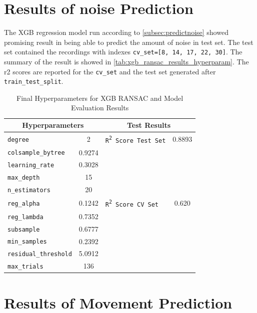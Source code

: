 \documentclass{iutbscthesis}
\begin{document}
\section{Results of noise Prediction}
The XGB regression model run according to \autoref{subsec:predictnoise} showed promising result in being able to predict the amount of noise in test set. The test set contained the recordings with indexes \texttt{cv\_set=[8, 14, 17, 22, 30]}. The summary of the result is showed in \autoref{tab:xgb_ransac_results_hyperparam}. The r2 scores are reported for the \texttt{cv\_set} and the test set generated after \texttt{train\_test\_split}.
\begin{table}[htbp]
\centering
\caption{Final Hyperparameters for XGB RANSAC and Model Evaluation Results}
\label{tab:xgb_ransac_results_hyperparam}
\begin{tabular}{|l|c||l|c|}
    \hline
        \multicolumn{2}{|c||}{\textbf{Hyperparameters}} & \multicolumn{2}{c|}{\textbf{Test Results}} \\
        \hline
        \texttt{degree} & 2 & \texttt{R\textsuperscript{2} Score Test Set} & 0.8893 \\
        \texttt{colsample\_bytree} & 0.9274 &  & \\
        \texttt{learning\_rate} & 0.3028 & & \\
        \texttt{max\_depth} & 15 & & \\
        \texttt{n\_estimators} & 20 & & \\
        \texttt{reg\_alpha} & 0.1242 & \texttt{R\textsuperscript{2} Score CV Set} & 0.620 \\
        \texttt{reg\_lambda} & 0.7352 & & \\
        \texttt{subsample} & 0.6777 & & \\
        \texttt{min\_samples} & 0.2392 & & \\
        \texttt{residual\_threshold} & 5.0912 & & \\
        \texttt{max\_trials} & 136 & & \\
        \hline
    \end{tabular}
\end{table}

\section{Results of Movement Prediction}
\end{document}
